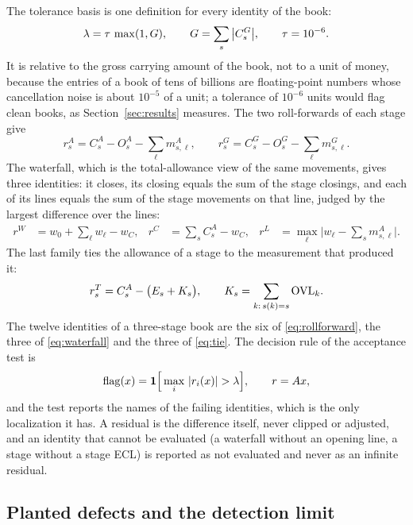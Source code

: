 The tolerance basis is one definition for every identity of the book:
\begin{equation}
\lambda=\tau\,\max(1,G),\qquad G=\sum_{s}\big|C^{G}_{s}\big|,\qquad \tau=10^{-6}.
\label{eq:limit}
\end{equation}
It is relative to the gross carrying amount of the book, not to a unit of money, because the entries of a book of tens of billions are floating-point numbers whose cancellation noise is about $10^{-5}$ of a unit; a tolerance of $10^{-6}$ units would flag clean books, as Section~\ref{sec:results} measures.
The two roll-forwards of each stage give
\begin{equation}
r^{A}_{s}=C^{A}_{s}-O^{A}_{s}-\sum_{\ell}m^{A}_{s,\ell},\qquad r^{G}_{s}=C^{G}_{s}-O^{G}_{s}-\sum_{\ell}m^{G}_{s,\ell}.
\label{eq:rollforward}
\end{equation}
The waterfall, which is the total-allowance view of the same movements, gives three identities: it closes, its closing equals the sum of the stage closings, and each of its lines equals the sum of the stage movements on that line, judged by the largest difference over the lines:
\begin{align}
r^{W}&=w_0+\sum_{\ell}w_\ell-w_C, &
r^{C}&=\sum_{s}C^{A}_{s}-w_C, &
r^{L}&=\max_{\ell}\Big|w_\ell-\sum_{s}m^{A}_{s,\ell}\Big|.
\label{eq:waterfall}
\end{align}
The last family ties the allowance of a stage to the measurement that produced it:
\begin{equation}
r^{T}_{s}=C^{A}_{s}-\big(E_{s}+K_{s}\big),\qquad K_{s}=\sum_{k:\,s(k)=s}\mathrm{OVL}_{k}.
\label{eq:tie}
\end{equation}
The twelve identities of a three-stage book are the six of \eqref{eq:rollforward}, the three of \eqref{eq:waterfall} and the three of \eqref{eq:tie}.
The decision rule of the acceptance test is
\begin{equation}
\mathrm{flag}(x)=\mathbf{1}\Big[\max_{i}\,|r_i(x)|>\tlim\Big],\qquad r=Ax,
\label{eq:decision}
\end{equation}
and the test reports the names of the failing identities, which is the only localization it has.
A residual is the difference itself, never clipped or adjusted, and an identity that cannot be evaluated (a waterfall without an opening line, a stage without a stage ECL) is reported as not evaluated and never as an infinite residual.

\subsection{Planted defects and the detection limit}
\label{sec:method-defects}

